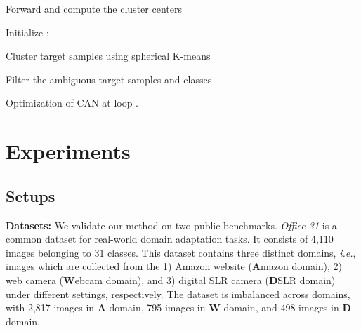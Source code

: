 \documentclass[10pt,twocolumn,letterpaper]{article}
\begin{document}
\begin{algorithm}[h]




 




  Forward  and compute the  cluster centers  \; 
  
  Initialize :  \;
  
  Cluster target samples  using spherical K-means\;
  
  Filter the ambiguous target samples and classes\;
  




 \caption{Optimization of CAN at loop .}
 \label{alg}
\end{algorithm}










 
\section{Experiments}\label{sec:experiments}
\subsection{Setups}
\noindent\textbf{Datasets:} We validate our method on two public benchmarks. \emph{Office-31} \cite{saenko2010adapting} is a common dataset for real-world domain adaptation tasks. 
It consists of 4,110 images belonging to 31 classes. 
This dataset contains three distinct domains, \emph{i.e.}, images which are collected from the 1) Amazon website (\textbf{A}mazon domain), 
2) web camera (\textbf{W}ebcam domain), 
and 3) digital SLR camera (\textbf{D}SLR domain) under different settings, respectively.
The dataset is imbalanced across domains, 
with 2,817 images in \textbf{A} domain, 795 images in \textbf{W} domain, and 498 images in \textbf{D} domain.
\end{document}
